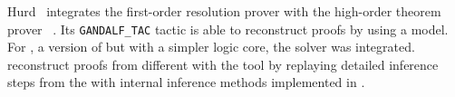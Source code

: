 \documentclass[../main.tex]{subfiles}
\begin{document}
Hurd~\cite{Hurd1999} integrates the first-order resolution prover
 with the high-order
theorem prover ~\cite{norrish2007hol}.
Its \verb!GANDALF_TAC! tactic is able to reconstruct  proofs
by using a  model. For , a version of
 but with a simpler logic core, the \SMT solver 
was integrated. \citeauthor{kaliszyk2013}~\cite{kaliszyk2013}
reconstruct proofs from different \ATPs with the  tool by
replaying detailed inference steps from the \ATPs with internal
inference methods implemented in .
\end{document}
